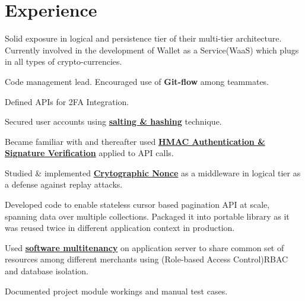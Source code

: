 \documentclass[]{deedy-resume-openfont}
\begin{document}
\begin{minipage}[t]{0.33\textwidth}





%

\end{minipage}
\hfill
\begin{minipage}[t]{0.66\textwidth}


\section{Experience}

\vspace{\topsep} %
\begin{tightemize}
\item  Solid exposure in logical and persistence tier of their multi-tier
  architecture. Currently involved in the development of Wallet as a Service(WaaS)
  which plugs in all types of crypto-currencies.
\item Code management lead. Encouraged use of \textbf{Git-flow} among teammates.
\item Defined APIs for 2FA Integration.
\item Secured user accounts using \href{http://swlogs.me/blog/user-auth/}{\textbf{salting \& hashing}} technique.
\item Became familiar with and thereafter used  \href{http://swlogs.me/blog/hmac-authentication/}{\textbf{HMAC Authentication \& Signature Verification}} applied to API calls.
\item Studied \& implemented \href{http://swlogs.me/DIY/nonce-auth-systems/}{\textbf{Crytographic Nonce}}
  as a middleware in logical tier as a defense against replay attacks.
\item Developed code to enable stateless cursor based pagination API at scale, spanning data over multiple
  collections. Packaged it into portable library as it was reused twice in different application context in production.
\item Used \href{http://swlogs.me/DIY/multi-tenancy/}{\textbf{software multitenancy}} on application server to share common set of resources among different merchants using (Role-based Access Control)RBAC and database isolation.
\item Documented project module workings and manual test cases.
\end{tightemize}
\sectionsep


\end{minipage}
\end{document}
